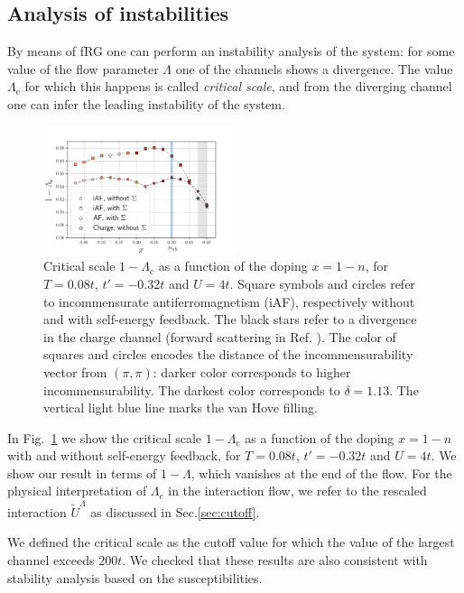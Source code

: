 \subsection{Analysis of instabilities}
By means of fRG one can perform an instability analysis of the system: 
for some value of the flow parameter $\Lambda$ one of the channels shows a divergence. 
The value $\Lambda_{\mathrm{c}} $ for which this happens is called \textit{critical scale}, and from the diverging channel one can infer the leading instability of the system. 
\begin{figure}
\includegraphics[width=0.5\textwidth]{images/phasediag.png}
\caption{Critical scale $1-\Lambda_{\mathrm{c}}$ as a function of the doping $x=1-n$, for $T = 0.08t$, $t'=-0.32t$ and $U=4t$. 
Square symbols and circles refer to incommensurate antiferromagnetism (iAF), respectively without and with self-energy feedback.
The black stars refer to a divergence in the charge channel (forward scattering in Ref. ). 
The color of squares and circles encodes the distance of the incommensurability vector from $(\pi,\pi)$: darker color corresponds to higher incommensurability. The darkest color corresponds to $\delta=1.13$. 
The vertical light blue line marks the van Hove filling.}  
\label{fig:criscale} 
\end{figure}
In Fig.~\ref{fig:criscale} we show the critical scale $1-\Lambda_{\mathrm{c}}$ as a function of the doping $x=1-n$ with and without self-energy feedback,  for $T=0.08t$, $t'=-0.32t$ and  $U=4t$.
We show our result in terms of $1-\Lambda$, which vanishes at the end of the flow. 
For the physical interpretation of $\Lambda_c$ in the interaction flow, we refer to the rescaled interaction\cite{Honerkamp2004} $\tilde U ^\Lambda$ as discussed in Sec.\ref{sec:cutoff}.  


We defined the critical scale as the cutoff value for which the value of  the largest channel exceeds $200t$. 
We checked that these results are also consistent with stability analysis based on the susceptibilities.        

